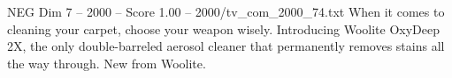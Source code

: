 \begin{textsample}{NEG Dim 7 – 2000 – Score 1.00 – 2000/tv\_com\_2000\_74.txt}  \label{ex:f7_neg_045}
When it comes to cleaning your carpet, choose your weapon wisely.
Introducing Woolite OxyDeep 2X, the only double-barreled aerosol cleaner that permanently removes stains all the way through.
New from Woolite.

\end{textsample}
